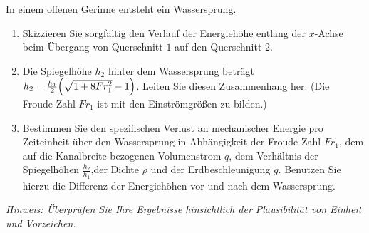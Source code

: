 \documentclass{exercise}
\begin{document}
    \begin{problem}
        In einem offenen Gerinne entsteht ein Wassersprung.
        \begin{center}
        \end{center}
        \begin{enumerate}
            \item Skizzieren Sie sorgfältig den Verlauf der Energiehöhe entlang der \(x\)-Achse beim Übergang von Querschnitt \(1\) auf den Querschnitt \(2\).
            \item Die Spiegelhöhe \(h_2\) hinter dem Wassersprung beträgt \(h_2 = \frac{h_1}{2}\parentheses*{\sqrt{1 + 8Fr_1^2} - 1}\).
            Leiten Sie diesen Zusammenhang her.
            (Die Froude-Zahl \(Fr_1\) ist mit den Einströmgrößen zu bilden.)
            \item Bestimmen Sie den spezifischen Verlust an mechanischer Energie pro Zeiteinheit über den Wassersprung in Abhängigkeit der Froude-Zahl \(Fr_1\), dem auf die Kanalbreite bezogenen Volumenstrom \(q\), dem Verhältnis der Spiegelhöhen \(\frac{h_2}{h_1}\),der Dichte \(\rho\) und der Erdbeschleunigung \(g\).
            Benutzen Sie hierzu die Differenz der Energiehöhen vor und nach dem Wassersprung.
        \end{enumerate}
        \emph{Hinweis: Überprüfen Sie Ihre Ergebnisse hinsichtlich der Plausibilität von Einheit und Vorzeichen.}
    \end{problem}
    
\end{document}
